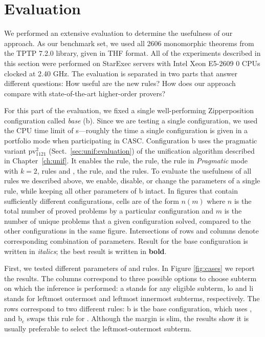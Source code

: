 \section{Evaluation} 
\label{sect:bool:eval}

We performed an extensive evaluation to determine the  usefulness of our approach. As
our benchmark set, we used all 2606 monomorphic theorems from the TPTP 7.2.0 library,
given in THF format. All of the experiments described in this section were
performed on StarExec \cite{sst-14-starexec} servers with Intel Xeon E5-2609 0 CPUs clocked at 2.40 GHz. The evaluation is separated in two parts that
answer different questions: How useful are the new rules? How 
does our approach compare with state-of-the-art higher-order provers?

For this part of the evaluation, we fixed a single well-perform\-ing Zipperposition configuration
called \emph{base} (b). Since we are testing a single configuration, we
used the CPU time limit of  s---roughly the time a single configuration is
given in a portfolio mode when participating in CASC. Configuration {b} uses the pragmatic variant
pv$_{1121}^{2}$ (Sect.~\ref{sec:unif:evaluation}) of the unification algorithm described in Chapter~\ref{ch:unif}. 
It enables the  rule,
the  rule, the  rule in \emph{Pragmatic} mode with $k=2$,
rules  and , the  rule, and the  rules. 
To evaluate the usefulness of
all rules we described above, we enable, disable, or change the
parameters of a single rule, while keeping all other parameters of b intact. 
In figures that contain sufficiently different configurations, cells are of the form $n (m)$ where $n$ is the total
number of proved problems by a particular configuration and $m$ is the number of
unique problems that a given configuration solved, compared to the other
configurations in the same figure. Intersections of rows and columns
denote corresponding combination of parameters.
Result for the base configuration is written in \emph{italics}; the best result
is written in \textbf{bold}.

First, we tested different parameters of  and 
rules. In Figure \ref{fig:cases} we report the results. The columns correspond to
three possible options to choose subterm on which the inference is performed:
{a} stands for any eligible subterm, {lo} and {li} stands
for leftmost outermost and leftmost innermost subterms, respectively. The rows
correspond to two different rules: 
{b} is the base configuration, which uses , and {b$_\text{c}$}
swaps this rule for . Although the margin is slim, the results show it is usually preferable to select the leftmost-outermost
subterm.

